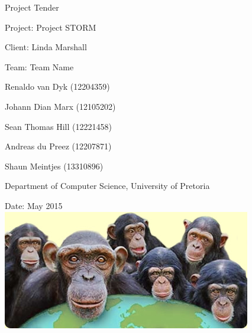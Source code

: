 \documentclass[12pt, oneside]{article}
\begin{document}
\thispagestyle{empty}
\begin{center}
\begin{minipage}{0.9\linewidth}
    \centering


    {\normalsize Project Tender\par}
    \vspace{1cm}
    {\Large Project: Project STORM\par}
{\normalsize Client: Linda Marshall\par}
    \vspace{1cm}
   {\Large Team: Team Name\par}
    {\normalsize Renaldo van Dyk (12204359)\par}
    {\normalsize Johann Dian Marx (12105202)\par}
    {\normalsize Sean Thomas Hill (12221458)\par}
    {\normalsize Andreas du Preez (12207871)\par}
    {\normalsize Shaun Meintjes (13310896)\par}
{\normalsize Department of Computer Science, University of Pretoria\par}
    \vspace{1cm}

 {\normalsize Date: May 2015}
\vspace{1cm}
    \includegraphics[scale=0.9]{example1} %

    \vspace{1cm}
    
\end{minipage}
\end{center}
\clearpage

\newpage
\end{document}
